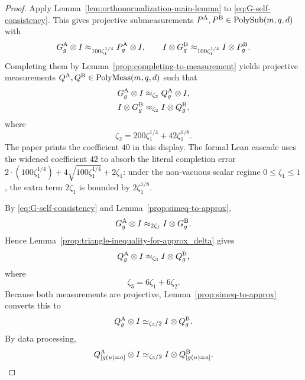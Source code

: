 \begin{proof}
	Apply Lemma~\ref{lem:orthonormalization-main-lemma} to \ref{eq:G-self-consistency}. This gives projective submeasurements $P^{\mathrm A},P^{\mathrm B} \in \mathrm{PolySub}(m,q,d)$ with
	\[
		G_g^{\mathrm A} \otimes I \approx_{100\zeta_1^{1/4}} P_g^{\mathrm A} \otimes I,
		\qquad
		I \otimes G_g^{\mathrm B} \approx_{100\zeta_1^{1/4}} I \otimes P_g^{\mathrm B}.
	\]
	Completing them by Lemma~\ref{prop:completing-to-measurement} yields projective measurements $Q^{\mathrm A},Q^{\mathrm B} \in \mathrm{PolyMeas}(m,q,d)$ such that
	\begin{align}
		G_g^{\mathrm A} \otimes I & \approx_{\zeta_2} Q_g^{\mathrm A} \otimes I, \label{eq:G-with-Q-A} \\
		I \otimes G_g^{\mathrm B} & \approx_{\zeta_2} I \otimes Q_g^{\mathrm B}, \notag
	\end{align}
	where
	\[
		\zeta_2 = 200\zeta_1^{1/4} + 42\zeta_1^{1/8}.
	\]
	The paper prints the coefficient $40$ in this display.  The formal Lean
	cascade uses the widened coefficient $42$ to absorb the literal completion
	error $2\cdot(100\zeta_1^{1/4})+4\sqrt{100\zeta_1^{1/4}}+2\zeta_1$:
	under the non-vacuous scalar regime $0 \le \zeta_1 \le 1$, the extra term
	$2\zeta_1$ is bounded by $2\zeta_1^{1/8}$.

	By \ref{eq:G-self-consistency} and Lemma~\ref{prop:simeq-to-approx},
	\[
		G_g^{\mathrm A} \otimes I \approx_{2\zeta_1} I \otimes G_g^{\mathrm B}.
	\]
	Hence Lemma~\ref{prop:triangle-inequality-for-approx_delta} gives
	\[
		Q_g^{\mathrm A} \otimes I \approx_{\zeta_3} I \otimes Q_g^{\mathrm B},
	\]
	where
	\[
		\zeta_3 = 6\zeta_1 + 6\zeta_2.
	\]
	Because both measurements are projective, Lemma~\ref{prop:simeq-to-approx} converts this to
	\begin{equation}\label{eq:completed-polynomial-consistency}
		Q_g^{\mathrm A} \otimes I \simeq_{\zeta_3/2} I \otimes Q_g^{\mathrm B}.
	\end{equation}
	By data processing,
	\begin{equation}\label{eq:point-evaluation-data-processing}
		Q_{[g(u)=a]}^{\mathrm A} \otimes I \simeq_{\zeta_3/2} I \otimes Q_{[g(u)=a]}^{\mathrm B}.
	\end{equation}


\end{proof}
